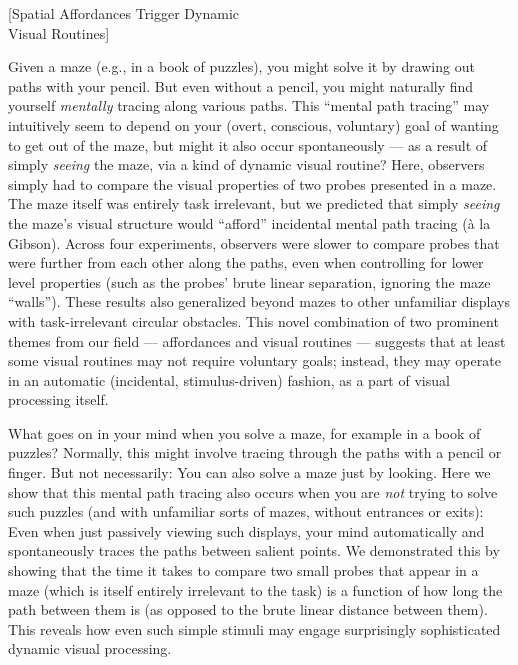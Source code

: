 [Spatial Affordances Trigger Dynamic \\ Visual Routines]
\label{chap:JEPG2024}


Given a maze (e.g., in a book of puzzles), you might solve it by drawing out paths with your pencil. But even without a pencil, you might naturally find yourself \textit{mentally} tracing along various paths. This “mental path tracing” may intuitively seem to depend on your (overt, conscious, voluntary) goal of wanting to get out of the maze, but might it also occur spontaneously --- as a result of simply \textit{seeing} the maze, via a kind of dynamic visual routine? Here, observers simply had to compare the visual properties of two probes presented in a maze. The maze itself was entirely task irrelevant, but we predicted that simply \textit{seeing} the maze’s visual structure would “afford” incidental mental path tracing (à la Gibson). Across four experiments, observers were slower to compare probes that were further from each other along the paths, even when controlling for lower level properties (such as the probes’ brute linear separation, ignoring the maze “walls”). These results also generalized beyond mazes to other unfamiliar displays with task-irrelevant circular obstacles. This novel combination of two prominent themes from our field --- affordances and visual routines --- suggests that at least some visual routines may not require voluntary goals; instead, they may operate in an automatic (incidental, stimulus-driven) fashion, as a part of visual processing itself.
\clearpage
\begin{kaobox}[frametitle=Significance Statement]
    What goes on in your mind when you solve a maze, for example in a book of puzzles? Normally, this might involve tracing through the paths with a pencil or finger. But not necessarily: You can also solve a maze just by looking. Here we show that this mental path tracing also occurs when you are \textit{not} trying to solve such puzzles (and with unfamiliar sorts of mazes, without entrances or exits): Even when just passively viewing such displays, your mind automatically and spontaneously traces the paths between salient points. We demonstrated this by showing that the time it takes to compare two small probes that appear in a maze (which is itself entirely irrelevant to the task) is a function of how long the path between them is (as opposed to the brute linear distance between them). This reveals how even such simple stimuli may engage surprisingly sophisticated dynamic visual processing.
\end{kaobox}
